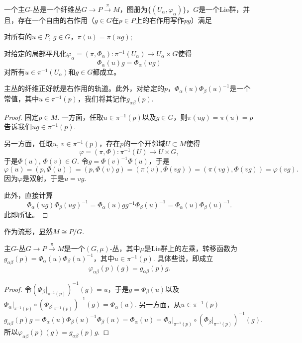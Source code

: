 \begin{para}[主$G$-丛]
一个主$G$-丛是一个纤维丛$G\to P\xrightarrow{\pi}M$，图册为$\{(U_\alpha,\varphi_\alpha)\}$，$G$是一个Lie群，并且，存在一个自由的右作用（$g\in G$在$p\in P$上的右作用写作$pg$）满足
\begin{compactenum}[~~~~(1)]
	\item 对所有的$u\in P$, $g\in G$，$\pi(u)=\pi(ug)$;
	\item 对给定的局部平凡化$\varphi_\alpha=(\pi,\Phi_\alpha):\pi^{-1}(U_\alpha)\to U_\alpha\times G$使得
	\[
	\Phi_\alpha(u)g=\Phi_\alpha(ug)
	\]
	对所有$u\in \pi^{-1}(U_\alpha)$和$g\in G$都成立。
\end{compactenum}
\end{para}

\begin{lem}
主丛的纤维正好就是右作用的轨道。此外，对给定的$p$，$\Phi_{\alpha}(u)\Phi_{\beta}(u)^{-1}$是一个常值，其中$u\in \pi^{-1}(p)$，我们将其记作$g_{\alpha\beta}(p)$.
\end{lem}

\begin{proof}
	固定$p\in M$. 一方面，任取$u\in\pi^{-1}(p)$以及$g\in G$，则$\pi(ug)=\pi(u)=p$告诉我们$ug\in \pi^{-1}(p)$. 

	另一方面，任取$u$, $v\in\pi^{-1}(p)$，存在$p$的一个开邻域$U\subset M$使得
	\[
	\varphi=(\pi,\Phi):\pi^{-1}(U)\to U\times G,
	\]
	于是$\Phi(u)$, $\Phi(v)\in G$. 令$g=\Phi(v)^{-1}\Phi(u)$，于是
	\[
	\varphi(u)=(p,\Phi(u))=(p,\Phi(v)g)=(\pi(v),\Phi(vg))=(\pi(vg),\Phi(vg))=\varphi(vg).
	\]
	因为$\varphi$是双射，于是$u=vg$.

	此外，直接计算
	\[
		\Phi_{\alpha}(ug)\Phi_{\beta}(ug)^{-1}=\Phi_{\alpha}(u)gg^{-1}\Phi_{\beta}(u)^{-1}=\Phi_{\alpha}(u)\Phi_{\beta}(u)^{-1}.
	\]
	此即所证。
\end{proof}

作为流形，显然$M\cong P/G$.

\begin{pro}\label{pro:8}
主$G$-丛$G\to P\xrightarrow{\pi}M$是一个$(G,\mu)$-丛，其中$\mu$是Lie群上的左乘，转移函数为$g_{\alpha\beta}(p)=\Phi_{\alpha}(u)\Phi_{\beta}(u)^{-1}$，其中$u\in \pi^{-1}(p)$. 具体些说，即成立
\[
	\varphi_{\alpha\beta}(p)(g)=g_{\alpha\beta}(p)g.
\]
\end{pro}

\begin{proof}
	令$\left(\Phi_{\beta}|_{\pi^{-1}(p)}\right)^{-1}(g)=u$，于是$g=\Phi_\beta(u)$以及$\Phi_{\alpha}|_{\pi^{-1}(p)}\circ \left(\Phi_{\beta}|_{\pi^{-1}(p)}\right)^{-1}(g)=\Phi_{\alpha}(u)$. 另一方面，从$u\in \pi^{-1}(p)$
	\[
		g_{\alpha\beta}(p)g=\Phi_{\alpha}(u)\Phi_{\beta}(u)^{-1}\Phi_\beta(u)=\Phi_{\alpha}(u)=\Phi_{\alpha}|_{\pi^{-1}(p)}\circ \left(\Phi_{\beta}|_{\pi^{-1}(p)}\right)^{-1}(g).
	\]
	所以$\varphi_{\alpha\beta}(p)(g)=g_{\alpha\beta}(p)g$.
\end{proof}


